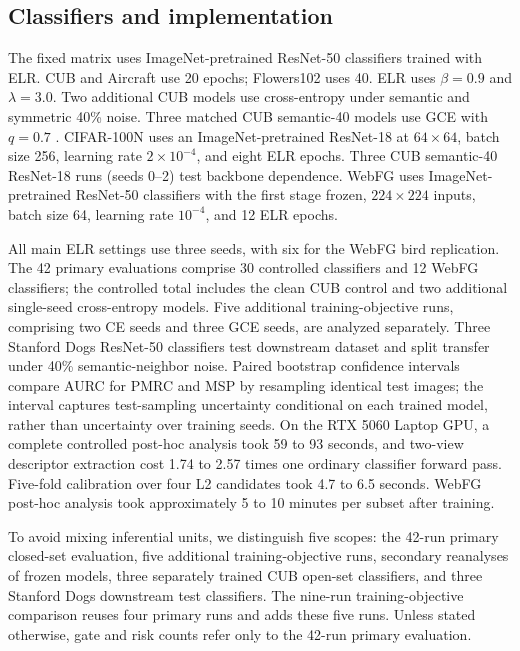 \documentclass[review,times]{elsarticle}
\newcommand{\method}{PMRC}
\begin{document}
\subsection{Classifiers and implementation}

The fixed matrix uses ImageNet-pretrained ResNet-50 classifiers trained with ELR. CUB and Aircraft use 20 epochs; Flowers102 uses 40. ELR uses $\beta=0.9$ and $\lambda=3.0$. Two additional CUB models use cross-entropy under semantic and symmetric 40\% noise. Three matched CUB semantic-40 models use GCE with $q=0.7$ \citep{zhang2018gce}. CIFAR-100N uses an ImageNet-pretrained ResNet-18 at $64\times64$, batch size 256, learning rate $2\times10^{-4}$, and eight ELR epochs. Three CUB semantic-40 ResNet-18 runs (seeds 0--2) test backbone dependence. WebFG uses ImageNet-pretrained ResNet-50 classifiers with the first stage frozen, $224\times224$ inputs, batch size 64, learning rate $10^{-4}$, and 12 ELR epochs.

All main ELR settings use three seeds, with six for the WebFG bird replication. The 42 primary evaluations comprise 30 controlled classifiers and 12 WebFG classifiers; the controlled total includes the clean CUB control and two additional single-seed cross-entropy models. Five additional training-objective runs, comprising two CE seeds and three GCE seeds, are analyzed separately. Three Stanford Dogs ResNet-50 classifiers test downstream dataset and split transfer under 40\% semantic-neighbor noise. Paired bootstrap confidence intervals compare AURC for \method{} and MSP by resampling identical test images; the interval captures test-sampling uncertainty conditional on each trained model, rather than uncertainty over training seeds. On the RTX 5060 Laptop GPU, a complete controlled post-hoc analysis took 59 to 93 seconds, and two-view descriptor extraction cost 1.74 to 2.57 times one ordinary classifier forward pass. Five-fold calibration over four L2 candidates took 4.7 to 6.5 seconds. WebFG post-hoc analysis took approximately 5 to 10 minutes per subset after training.

To avoid mixing inferential units, we distinguish five scopes: the 42-run primary closed-set evaluation, five additional training-objective runs, secondary reanalyses of frozen models, three separately trained CUB open-set classifiers, and three Stanford Dogs downstream test classifiers. The nine-run training-objective comparison reuses four primary runs and adds these five runs. Unless stated otherwise, gate and risk counts refer only to the 42-run primary evaluation.
\end{document}
